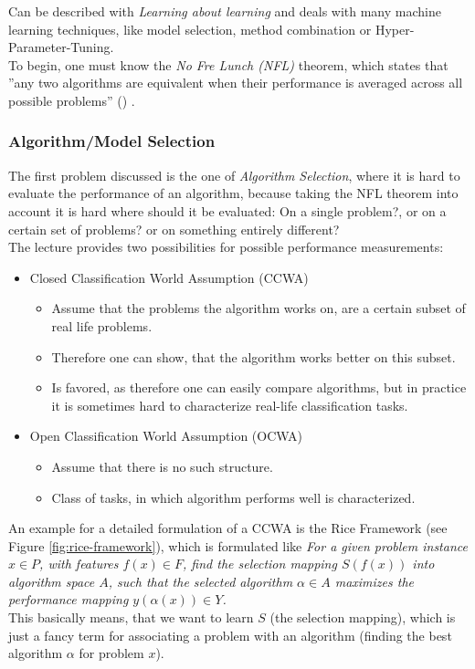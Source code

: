\documentclass[12pt,a4paper]{article}
\begin{document}
\noindent Can be described with \textit{Learning about learning} and deals with many machine learning techniques, like model selection, method combination or Hyper-Parameter-Tuning.\\
To begin, one must know the \textit{No Fre Lunch (NFL)} theorem, which states that ''any two algorithms are equivalent when their performance is averaged across all possible problems'' (\cite{nfl}) .\\[1em]

\subsubsection{Algorithm/Model Selection}


The first problem discussed is the one of \textit{Algorithm Selection}, where it is hard to evaluate the performance of an algorithm, because taking the NFL theorem into account it is hard where should it be evaluated: On a single problem?, or on a certain set of problems? or on something entirely different?\\
The lecture provides two possibilities for possible performance measurements:
\begin{itemize}
    \item Closed Classification World Assumption (CCWA)
    \begin{itemize}
        \item Assume that the problems the algorithm works on, are a certain subset of real life problems.
        \item Therefore one can show, that the algorithm works better on this subset.
        \item Is favored, as therefore one can easily compare algorithms, but in practice it is sometimes hard to characterize real-life classification tasks.
    \end{itemize}
    \item Open Classification World Assumption (OCWA)
    \begin{itemize}
        \item Assume that there is no such structure.
        \item Class of tasks, in which algorithm performs well is characterized.
    \end{itemize}
\end{itemize}

\noindent An example for a detailed formulation of a CCWA is the Rice Framework (see Figure \ref{fig:rice-framework}), which is formulated like \textit{For a given problem instance \(x \in P\), with features \(f(x) \in F\), find the selection mapping \(S(f(x))\) into algorithm space \(A\), such that the selected algorithm \(\alpha \in A\) maximizes the performance mapping \(y(\alpha(x)) \in Y\).}\\
This basically means, that we want to learn \(S\) (the selection mapping), which is just a fancy term for associating a problem with an algorithm (finding the best algorithm \(\alpha\) for problem \(x\)).\\
\end{document}
